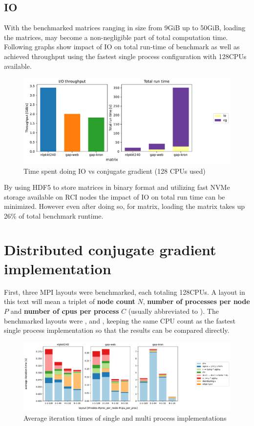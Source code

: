 \documentclass[thesis=M,english]{FITthesis}[2019/12/23]
\begin{document}
\subsection{IO}

With the benchmarked matrices ranging in size from 9GiB up to 50GiB, loading the matrices,
may become a non-negligible part of total computation time. Following graphs show impact of
IO on total run-time of benchmark as well as achieved throughput using the fastest single process
configuration with 128CPUs available.

\begin{figure}[htp]
    \centering
    \includegraphics[scale=0.5]{static/io_sp.pdf}
    \caption{Time spent doing IO vs conjugate gradient (128 CPUs used)}
\end{figure}

By using HDF5 to store matrices in binary format and utilizing fast NVMe storage available
on RCI nodes the impact of IO on total run time can be minimized. However even after doing so,
for  matrix, loading the matrix takes up 26\% of total benchmark runtime.


\section{Distributed conjugate gradient implementation}

First, three MPI layouts were benchmarked, each totaling 128CPUs. A layout
in this text will mean a triplet of \textbf{node count} $N$,
\textbf{number of processes per node} $P$
and \textbf{number of cpus per process} $C$ (usually abbreviated to ).
The benchmarked layouts were ,  and , keeping
the same CPU count as the fastest single process implementation so that the results
can be compared directly.

\begin{figure}[htp]
    \centering
    \includegraphics[scale=0.35]{static/mpi.pdf}
    \caption{Average iteration times of single and multi process implementations}
\end{figure}
\end{document}
